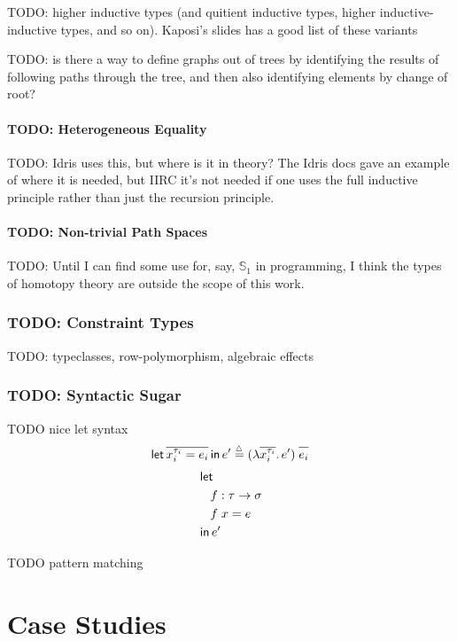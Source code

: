\documentclass[11pt]{article} %
\theoremstyle{definition}
\theoremstyle{remark}
\begin{document}
TODO: higher inductive types (and quitient inductive types, higher inductive-inductive types, and so on).
Kaposi's slides has a good list of these variants

TODO:
is there a way to define graphs out of trees by identifying the results of following paths through the tree, and then also identifying elements by change of root?


\subsection{TODO: Heterogeneous Equality}

TODO: Idris uses this, but where is it in theory?
The Idris docs gave an example of where it is needed, but IIRC it's not needed if one uses the full inductive principle rather than just the recursion principle.

\subsection{TODO: Non-trivial Path Spaces}\label{subsec:fancy-path-spaces}

TODO: Until I can find some use for, say, $\mathbb S_1$ in programming, I think the types of homotopy theory are outside the scope of this work.

\section{TODO: Constraint Types}

TODO: typeclasses, row-polymorphism, algebraic effects

\section{TODO: Syntactic Sugar}

TODO nice let syntax
$$\letin{\overline{x_i^{\tau_i} = e_i}}e' \trieq (\fun{\overline{x_i^{\tau_i}}}e')\;\overline{\mathstrut e_i}$$
\begin{align*}
& \mathinner{\textsf{let}} \\
& \quad f : \tau \to \sigma \\
& \quad f\;x = e \\
& \mathinner{\textsf{in}} e'
\end{align*}

TODO pattern matching

\part{Case Studies}
\end{document}
